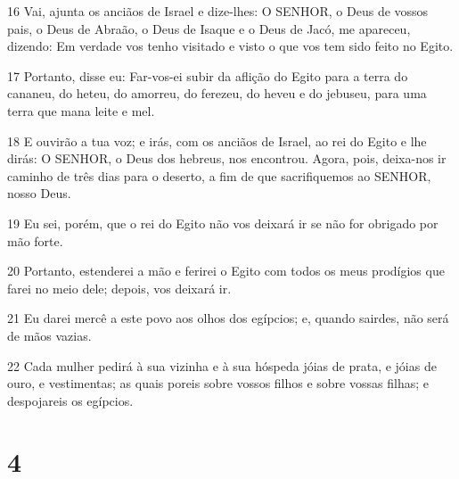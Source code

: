 \par 16 Vai, ajunta os anciãos de Israel e dize-lhes: O SENHOR, o Deus de vossos pais, o Deus de Abraão, o Deus de Isaque e o Deus de Jacó, me apareceu, dizendo: Em verdade vos tenho visitado e visto o que vos tem sido feito no Egito.
\par 17 Portanto, disse eu: Far-vos-ei subir da aflição do Egito para a terra do cananeu, do heteu, do amorreu, do ferezeu, do heveu e do jebuseu, para uma terra que mana leite e mel.
\par 18 E ouvirão a tua voz; e irás, com os anciãos de Israel, ao rei do Egito e lhe dirás: O SENHOR, o Deus dos hebreus, nos encontrou. Agora, pois, deixa-nos ir caminho de três dias para o deserto, a fim de que sacrifiquemos ao SENHOR, nosso Deus.
\par 19 Eu sei, porém, que o rei do Egito não vos deixará ir se não for obrigado por mão forte.
\par 20 Portanto, estenderei a mão e ferirei o Egito com todos os meus prodígios que farei no meio dele; depois, vos deixará ir.
\par 21 Eu darei mercê a este povo aos olhos dos egípcios; e, quando sairdes, não será de mãos vazias.
\par 22 Cada mulher pedirá à sua vizinha e à sua hóspeda jóias de prata, e jóias de ouro, e vestimentas; as quais poreis sobre vossos filhos e sobre vossas filhas; e despojareis os egípcios.

\chapter{4}


